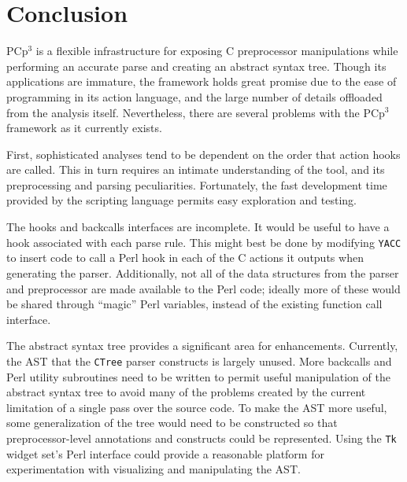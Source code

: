 \documentclass{article}
\newcommand{\pcp}{\mbox{\textsf{PCp}$^3$}}
\newcommand{\Perl}{\mbox{Perl}}
\newcommand{\C}{\mbox{C}}
\begin{document}
\section{Conclusion}
\label{sec:conclusion}





\pcp{} is a flexible infrastructure for
exposing \C{} preprocessor manipulations while performing an
accurate parse and creating an abstract syntax tree.  Though its
applications are immature, the framework holds great promise due
to the ease of programming in its action language, and the large number
of details offloaded from the analysis itself.  Nevertheless, there are several
problems with the \pcp{} framework as it currently exists.

First, sophisticated analyses tend to be dependent on the order that
action hooks are called.  This in turn requires an intimate
understanding of the tool, and its preprocessing and parsing
peculiarities.  Fortunately, the fast development time provided by the
scripting language permits easy exploration and testing.

The hooks and backcalls interfaces are incomplete.  It would be useful
to have a hook associated with each parse rule.  This might best be
done by modifying \texttt{YACC} to insert code to call a \Perl{} hook
in each of the \C{} actions it outputs when generating the parser.
Additionally, not all of the data
structures from the parser and preprocessor are made available to the
\Perl{} code;  ideally more of these would be shared through ``magic''
\Perl{} variables, instead of the existing function call interface.

The abstract syntax tree provides a significant area for enhancements.
Currently, the AST that the \texttt{CTree} parser
constructs is largely unused.  More backcalls and \Perl{} utility
subroutines need to be written to permit useful manipulation of the
abstract syntax tree to avoid many of the problems created by the current
limitation of a single pass over the source code.  To make the AST
more useful, some generalization of the tree would need to be
constructed so that preprocessor-level annotations and constructs could be
represented.  Using the \texttt{Tk} widget set's \Perl{} interface could
provide a reasonable platform for experimentation with visualizing and
manipulating the AST.
\end{document}
